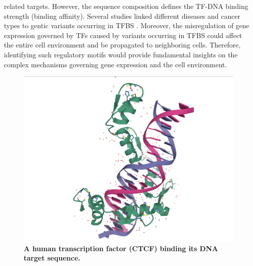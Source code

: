 \documentclass[a4paper, titlepage, 8pt, openright]{book}
\begin{document}
related targets. However, the sequence composition defines the TF-DNA binding strength (binding affinity). Several studies linked different diseases and cancer types to gentic variants occurring in TFBS \citep{docquier2005heightened, katainen2015ctcf, yu2019gata1}. Moreover, the misregulation of gene expression governed by TFs caused by variants occurring in TFBS could affect the entire cell environment and be propagated to neighboring cells. Therefore, identifying such regulatory motifs would provide fundamental insights on the complex mechanisms governing gene expression and the cell environment.
\begin{figure}
	\centering
	\includegraphics[width=\textwidth]{figures/ctcf_dna.png}
	\caption[A human transcription factor (CTCF) binding its DNA target sequence.]{\textbf{A human transcription factor (CTCF) binding its DNA target sequence.}}
	\label{fig:ctcf_dna}
\end{figure}
\end{document}

